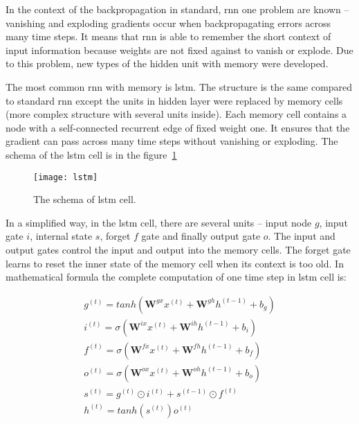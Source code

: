 \documentclass[thesis=M,english]{FITthesis}[2012/10/20]
\begin{document}
In the context of the backpropagation in standard, \gls{rnn} one problem are known -- vanishing and exploding gradients occur when backpropagating errors across many time steps\cite[13--14]{Lipton2015rnn}. It means that \gls{rnn} is able to remember the short context of input information because weights are not fixed against to vanish or explode. Due to this problem, new types of the hidden unit with memory were developed.

The most common \gls{rnn} with memory  is \gls{lstm}\cite[17]{Lipton2015rnn}. The structure is the same compared to standard \gls{rnn} except the units in hidden layer were replaced by memory cells (more complex structure with several units inside). Each memory cell contains a node with a self-connected recurrent edge of fixed weight one. It ensures that the gradient can pass across many time steps without vanishing or exploding. The schema of the \gls{lstm} cell is in the figure~\ref{fig:lstm} 

\begin{figure}[ht]\centering
    \texttt{[image: lstm]}
    \caption{The schema of \gls{lstm} cell.\cite[17]{Lipton2015rnn}}\label{fig:lstm}
\end{figure}


In a simplified way, in the \gls{lstm} cell, there are several units -- input node $g$, input gate $i$, internal state $s$, forget $f$ gate and finally output gate $o$. The input and output gates control the input and output into the memory cells. The forget gate learns to reset the inner state of the memory cell when its context is too old. In mathematical formula\cite[20]{Lipton2015rnn} the complete computation of one time step in \gls{lstm} cell is:

\begin{equation}
\begin{multlined}
g^{(t)} = tanh(\mathbf{W}^{gx}x^{(t)} + \mathbf{W}^{gh} h^{(t-1)} + b_g)\\
i^{(t)} = \sigma(\mathbf{W}^{ix}x^{(t)} + \mathbf{W}^{ih} h^{(t-1)} + b_i)\\
f^{(t)} = \sigma(\mathbf{W}^{fx}x^{(t)} + \mathbf{W}^{fh} h^{(t-1)} + b_f)\\
o^{(t)} = \sigma(\mathbf{W}^{ox}x^{(t)} + \mathbf{W}^{oh} h^{(t-1)} + b_o)\\
s^{(t)} = g^{(t)} \odot i^{(t)} + s^{(t-1)} \odot f^{(t)}\\
h^{(t)} = tanh(s^{(t)}) o^{(t)}\\
\end{multlined}
\end{equation}
\end{document}
